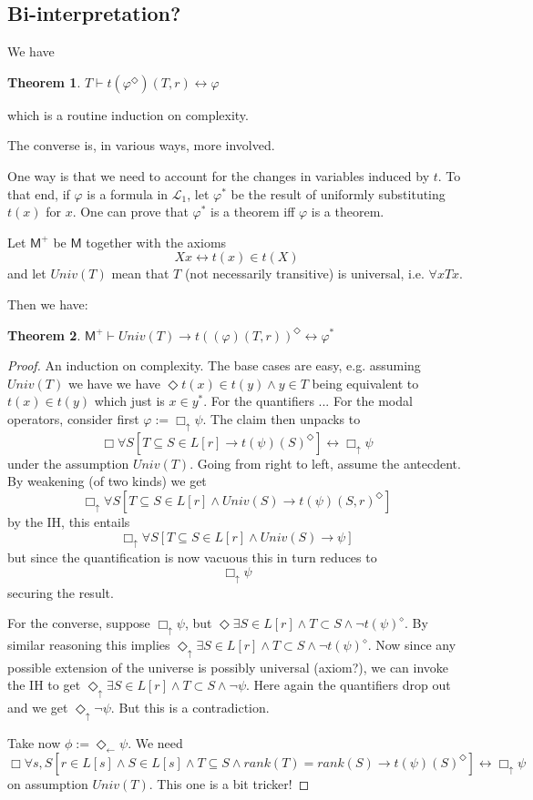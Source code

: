 \documentclass{article}
\newtheorem{Theorem}{Theorem}[section]
\theoremstyle{definition}
\newcommand{\du}{\Diamond_\uparrow}
\newcommand{\dl}{\Diamond_\leftarrow}
\newcommand{\bu}{\Box_\uparrow}
\begin{document}
\subsection{Bi-interpretation?}
We have
\begin{Theorem}
    $T \vdash t(\varphi^\Diamond)(T, r) \leftrightarrow \varphi$
\end{Theorem}
which is a routine induction on complexity.

The converse is, in various ways, more involved. 

One way is that we need to account for the changes in variables induced by $t$. 
To that end, if $\varphi$ is a formula in $\mathcal{L}_1$, let 
$\varphi^*$ be the result of uniformly substituting $t(x)$ for $x$. 
One can prove that $\varphi^*$ is a theorem iff $\varphi$ is a theorem. 

Let $\mathsf{M}^+$ be $\mathsf{M}$ together with the axioms 
\begin{equation}
    Xx \leftrightarrow t(x) \in t(X)
\end{equation}
and let $Univ(T)$ mean that $T$ (not necessarily transitive) is universal, 
i.e. $\forall x Tx$. 

Then we have:
\begin{Theorem}
    $\mathsf{M}^+ \vdash Univ(T) \rightarrow t((\varphi)(T, r))^\Diamond \leftrightarrow \varphi^*$
\end{Theorem}
\begin{proof}
    An induction on complexity. The base cases are easy, e.g. assuming $Univ(T)$ we have
    we have $\Diamond t(x) \in t(y) \wedge y \in T$ 
    being equivalent to $t(x) \in t(y)$ which just is $x \in y^*$.
    For the quantifiers ... 
    For the modal operators, consider first $\varphi := \bu \psi$. The claim then unpacks to
    \[ \Box \forall S [T \subseteq S \in L[r] \rightarrow t(\psi)(S)^\Diamond] \leftrightarrow \bu \psi
    \]
    under the assumption $Univ(T)$. Going from right to left, assume the antecdent. 
    By weakening (of two kinds)  
    we get  
    \[ \bu \forall S [T \subseteq S \in L[r] \wedge Univ(S) \rightarrow t(\psi)(S, r)^\Diamond]
    \]
    by the IH, this  entails
    \[ \bu \forall S [T \subseteq S \in L[r] \wedge Univ(S) \rightarrow \psi] 
    \]
    but since the quantification is now vacuous this in turn reduces to 
    \[ \bu  \psi 
    \]
    securing the result. 

    For the converse, suppose $\bu \psi$, but $\Diamond \exists S \in L[r] \wedge T \subset S \wedge \neg t(\psi)^\diamond$.
    By similar reasoning this implies $\du \exists S \in L[r] \wedge T \subset S \wedge \neg t(\psi)^\diamond$.
    Now since any possible extension of the universe is possibly universal (axiom?), we 
    can invoke the IH to get $\du \exists S \in L[r] \wedge T \subset S \wedge \neg \psi$.
    Here again the quantifiers drop out and we get $\du \neg \psi$. But this is a contradiction.

    Take now $\phi := \dl \psi$. We need
    \[ \Box \forall s, S[r \in L[s] \wedge S \in L[s] \wedge T \subseteq S \wedge rank(T) = rank(S) \rightarrow t(\psi)(S)^\Diamond] \leftrightarrow \bu \psi
    \]
    on assumption $Univ(T)$. This one is a bit tricker!
\end{proof}
\end{document}
